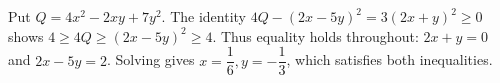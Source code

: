 Put $Q=4x^2-2xy+7y^2$. The identity $4Q-(2x-5y)^2=3(2x+y)^2\ge0$ shows $4\ge4Q\ge(2x-5y)^2\ge4$. Thus equality holds throughout: $2x+y=0$ and $2x-5y=2$. Solving gives $\boxed{x=\dfrac{1}{6},y=-\dfrac{1}{3}}$, which satisfies both inequalities.
